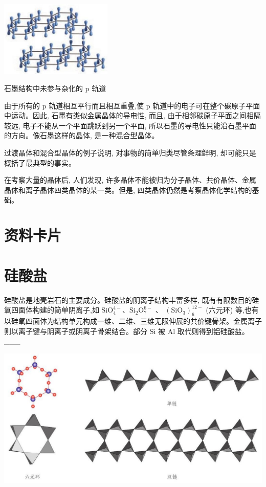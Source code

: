 \documentclass[10pt]{article}
\begin{document}
\begin{center}
\includegraphics[max width=0.4\textwidth]{images/0190e026-5a11-7df7-bd27-54d09026ba7a_93_810121.jpg}
\end{center}

石墨结构中未参与杂化的 \(\mathrm{p}\) 轨道

由于所有的 \(\mathrm{p}\) 轨道相互平行而且相互重叠,使 \(\mathrm{p}\) 轨道中的电子可在整个碳原子平面中运动。因此, 石墨有类似金属晶体的导电性, 而且, 由于相邻碳原子平面之间相隔较远, 电子不能从一个平面跳跃到另一个平面, 所以石墨的导电性只能沿石墨平面的方向。像石墨这样的晶体, 是一种混合型晶体。

过渡晶体和混合型晶体的例子说明, 对事物的简单归类尽管条理鲜明, 却可能只是概括了最典型的事实。

在考察大量的晶体后, 人们发现, 许多晶体不能被归为分子晶体、共价晶体、金属晶体和离子晶体四类晶体的某一类。但是, 四类晶体仍然是考察晶体化学结构的基础。

\section*{资料卡片}

\section*{硅酸盐}

硅酸盐是地壳岩石的主要成分。硅酸盐的阴离子结构丰富多样, 既有有限数目的硅氧四面体构建的简单阴离子,如 \({\mathrm{{SiO}}}_{4}^{4 - }\text{、}{\mathrm{{Si}}}_{2}{\mathrm{O}}_{7}^{6 - }\) 、 \({\left( {\mathrm{{SiO}}}_{3}\right) }_{6}^{{12} - }\) (六元环) 等,也有以硅氧四面体为结构单元构成一维、二维、三维无限伸展的共价键骨架。金属离子则以离子键与阴离子或阴离子骨架结合。部分 \(\mathrm{{Si}}\) 被 \(\mathrm{{Al}}\) 取代则得到铝硅酸盐。 \_\_\_

\begin{center}
\includegraphics[max width=1.0\textwidth]{images/0190e026-5a11-7df7-bd27-54d09026ba7a_94_306812.jpg}
\end{center}
\end{document}
